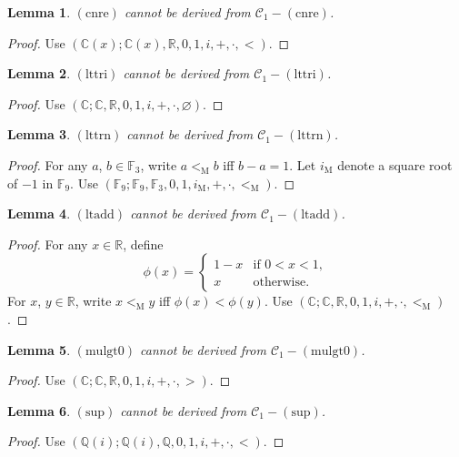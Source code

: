 \documentclass{article}
\newcommand\bC{\mathbb{C}}
\newcommand\bF{\mathbb{F}}
\newcommand\bR{\mathbb{R}}
\newcommand\bQ{\mathbb{Q}}
\newcommand\cC{\mathcal{C}}
\newcommand\rM{\mathrm{M}}
\newtheorem{lemma}{Lemma}[section]
\begin{document}
\begin{lemma}
$\mathrm{(cnre)}$ cannot be derived from $\cC_1 - \mathrm{(cnre)}$.
\end{lemma}
\begin{proof}
Use $(\bC(x); \bC(x), \bR, 0, 1, i, +, \cdot, <)$.
\end{proof}

\begin{lemma}
$\mathrm{(lttri)}$ cannot be derived from $\cC_1 - \mathrm{(lttri)}$.
\end{lemma}
\begin{proof}
Use $(\bC; \bC, \bR, 0, 1, i, +, \cdot, \varnothing)$.
\end{proof}

\begin{lemma}
$\mathrm{(lttrn)}$ cannot be derived from $\cC_1 - \mathrm{(lttrn)}$.
\end{lemma}
\begin{proof}
For any $a$, $b \in \bF_3$, write $a <_\rM b$ if{}f $b - a = 1$.
Let $i_\rM$ denote a square root of $-1$ in $\bF_9$.
Use $(\bF_9; \bF_9, \bF_3, 0, 1, i_\rM, +, \cdot, <_\rM)$.
\end{proof}

\begin{lemma}
$\mathrm{(ltadd)}$ cannot be derived from $\cC_1 - \mathrm{(ltadd)}$.
\end{lemma}
\begin{proof}
For any $x \in \bR$, define
\[ \phi(x) =
\begin{cases}
1 - x & \text{if $0 < x < 1$}, \\
x & \text{otherwise.}
\end{cases}
\]
For $x$, $y \in \bR$, write $x <_\rM y$ if{}f $\phi(x) < \phi(y)$.
Use $(\bC; \bC, \bR, 0, 1, i, +, \cdot, <_\rM)$.
\end{proof}

\begin{lemma}
$\mathrm{(mulgt0)}$ cannot be derived from $\cC_1 - \mathrm{(mulgt0)}$.
\end{lemma}
\begin{proof}
Use $(\bC; \bC, \bR, 0, 1, i, +, \cdot, >)$.
\end{proof}

\begin{lemma}
$\mathrm{(sup)}$ cannot be derived from $\cC_1 - \mathrm{(sup)}$.
\end{lemma}
\begin{proof}
Use $(\bQ(i); \bQ(i), \bQ, 0, 1, i, +, \cdot, <)$.
\end{proof}
\end{document}
